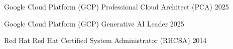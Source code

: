 

\begin{cvhonors}

  \cvhonor
  {Google Cloud Platform (GCP)} %
  {Professional Cloud Architect (PCA)} %
  {} %
  {2025} %

  \cvhonor
  {Google Cloud Platform (GCP)} %
  {Generative AI Leader} %
  {} %
  {2025} %

  \cvhonor
  {Red Hat}
  {Red Hat Certified System Administrator (RHCSA)}
  {}
  {2014}

\end{cvhonors}
